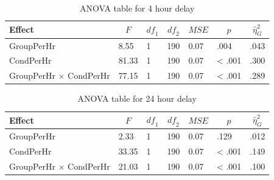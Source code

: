 \documentclass[man]{apa6}
\begin{document}
\begin{table}[tbp]
\begin{center}
\begin{threeparttable}
\caption{\label{tab:secondanova}ANOVA table for 4 hour delay}
\begin{tabular}{lllllll}
\toprule
Effect & \multicolumn{1}{c}{$F$} & \multicolumn{1}{c}{$\mathit{df}_1$} & \multicolumn{1}{c}{$\mathit{df}_2$} & \multicolumn{1}{c}{$\mathit{MSE}$} & \multicolumn{1}{c}{$p$} & \multicolumn{1}{c}{$\hat{\eta}^2_G$}\\
\midrule
GroupPerHr & 8.55 & 1 & 190 & 0.07 & .004 & .043\\
CondPerHr & 81.33 & 1 & 190 & 0.07 & < .001 & .300\\
GroupPerHr $\times$ CondPerHr & 77.15 & 1 & 190 & 0.07 & < .001 & .289\\
\bottomrule
\end{tabular}
\end{threeparttable}
\end{center}
\end{table}

\begin{table}[tbp]
\begin{center}
\begin{threeparttable}
\caption{\label{tab:secondanova}ANOVA table for 24 hour delay}
\begin{tabular}{lllllll}
\toprule
Effect & \multicolumn{1}{c}{$F$} & \multicolumn{1}{c}{$\mathit{df}_1$} & \multicolumn{1}{c}{$\mathit{df}_2$} & \multicolumn{1}{c}{$\mathit{MSE}$} & \multicolumn{1}{c}{$p$} & \multicolumn{1}{c}{$\hat{\eta}^2_G$}\\
\midrule
GroupPerHr & 2.33 & 1 & 190 & 0.07 & .129 & .012\\
CondPerHr & 33.35 & 1 & 190 & 0.07 & < .001 & .149\\
GroupPerHr $\times$ CondPerHr & 21.03 & 1 & 190 & 0.07 & < .001 & .100\\
\bottomrule
\end{tabular}
\end{threeparttable}
\end{center}
\end{table}
\end{document}
